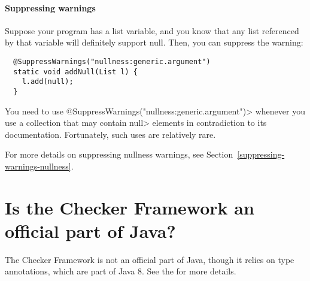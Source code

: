 




\paragraph{Suppressing warnings}

Suppose your program has a list variable, and you know that any list referenced
by that variable will definitely support null.  Then, you can suppress the
warning:

\begin{Verbatim}
  @SuppressWarnings("nullness:generic.argument")
  static void addNull(List l) {
    l.add(null);
  }
\end{Verbatim}

\noindent
You need to use \<@SuppressWarnings("nullness:generic.argument")>
whenever you use a collection that may contain \<null> elements in
contradiction to its documentation.  Fortunately, such uses are relatively
rare.


For more details on suppressing nullness warnings, see
Section~\ref{suppressing-warnings-nullness}.


\section{Is the Checker Framework an official part of Java?\label{faq-checker-framework-part-of-java}}

The Checker Framework is not an official part of Java, though it relies on
type annotations, which are part of Java 8.  See the
 for more details.


